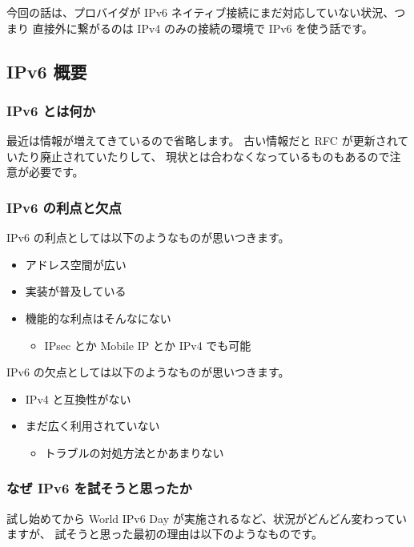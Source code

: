 \documentclass[mingoth,a4paper]{jsarticle}
\begin{document}
今回の話は、プロバイダが IPv6 ネイティブ接続にまだ対応していない状況、つまり
直接外に繋がるのは IPv4 のみの接続の環境で IPv6 を使う話です。
\subsection{IPv6 概要}

\subsubsection{IPv6 とは何か}


最近は情報が増えてきているので省略します。
古い情報だと RFC が更新されていたり廃止されていたりして、
現状とは合わなくなっているものもあるので注意が必要です。
\subsubsection{IPv6 の利点と欠点}

IPv6 の利点としては以下のようなものが思いつきます。

\begin{itemize}
\item アドレス空間が広い
\item 実装が普及している
\item 機能的な利点はそんなにない

\begin{itemize}
\item IPsec とか Mobile IP とか IPv4 でも可能
\end{itemize}

\end{itemize}


IPv6 の欠点としては以下のようなものが思いつきます。

\begin{itemize}
\item IPv4 と互換性がない
\item まだ広く利用されていない

\begin{itemize}
\item トラブルの対処方法とかあまりない
\end{itemize}

\end{itemize}
\subsubsection{なぜ IPv6 を試そうと思ったか}

試し始めてから World IPv6 Day が実施されるなど、状況がどんどん変わっていますが、
試そうと思った最初の理由は以下のようなものです。
\end{document}
